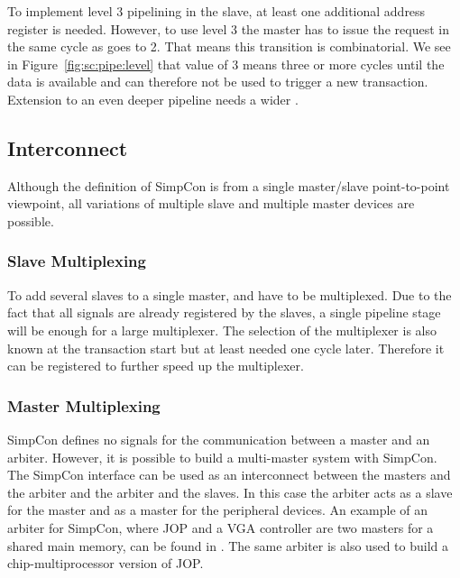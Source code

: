 To implement level 3 pipelining in the slave, at least one additional
address register is needed. However, to use level 3 the master has to
issue the request in the same cycle as  goes to 2.
That means this transition is combinatorial. We see in
Figure~\ref{fig:sc:pipe:level} that  value of 3 means
three or more cycles until the data is available and can therefore
not be used to trigger a new transaction. Extension to an even deeper
pipeline needs a wider .


\subsection{Interconnect}

Although the definition of SimpCon is from a single master/slave
point-to-point viewpoint, all variations of multiple slave and
multiple master devices are possible.

\subsubsection{Slave Multiplexing}

To add several slaves to a single master,  and
 have to be multiplexed. Due to the fact that all
 signals are already registered by the slaves, a
single pipeline stage will be enough for a large multiplexer. The
selection of the multiplexer is also known at the transaction start
but at least needed one cycle later. Therefore it can be registered
to further speed up the multiplexer.


\subsubsection{Master Multiplexing}

SimpCon defines no signals for the communication between a master and
an arbiter. However, it is possible to build a multi-master system
with SimpCon. The SimpCon interface can be used as an interconnect
between the masters and the arbiter and the arbiter and the slaves.
In this case the arbiter acts as a slave for the master and as a
master for the peripheral devices. An example of an arbiter for
SimpCon, where JOP and a VGA controller are two masters for a shared
main memory, can be found in \cite{jop:dma}. The same arbiter is also
used to build a chip-multiprocessor version of JOP.

